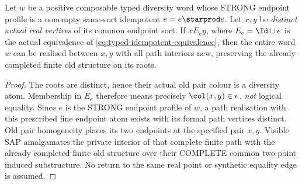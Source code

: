 \begin{lemma}
\label{lem:typed-idempotent-reinsert}
Let \(w\) be a positive composable typed diversity word
whose STRONG endpoint profile is a nonempty same-sort
idempotent \(e=e\starprod e\). Let \(x,y\) be
\emph{distinct actual real vertices} of its common endpoint
sort. If \(xE_ey\), where \(E_e=\Id\cup e\) is
the actual equivalence of
\eqref{eq:typed-idempotent-equivalence}, then the
entire word \(w\) can be realised between \(x,y\)
with all path interiors new, preserving the
already completed finite old structure on its roots.
\end{lemma}
\begin{proof}
The roots are distinct, hence their actual old
pair colour is a diversity atom. Membership in
\(E_e\) therefore means precisely
\(\col(x,y)\in e\), \emph{not} logical equality.
Since \(e\) is the STRONG endpoint profile of
\(w\), a path realisation with this prescribed
fine endpoint atom exists with its formal path
vertices distinct. Old pair homogeneity places
its two endpoints at the specified pair \(x,y\).
Visible SAP amalgamates the private interior of
that complete finite path with the already
completed finite old structure over their
COMPLETE common two-point induced substructure.
No return to the same real point or synthetic
equality edge is assumed.
\end{proof}

